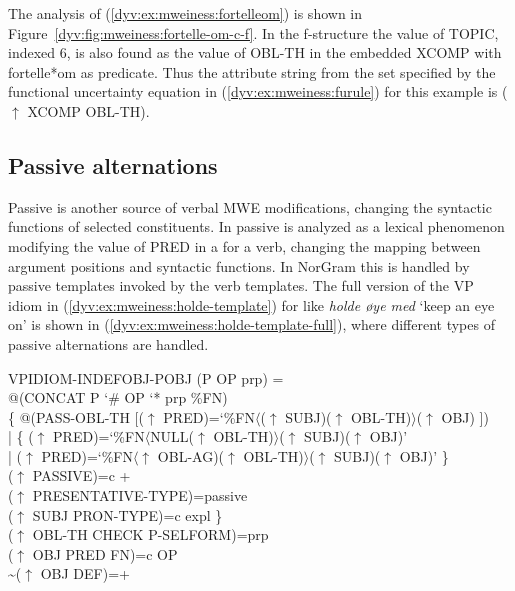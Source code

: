 \documentclass[output=paper]{langsci/langscibook}
\begin{document}
The analysis of  (\ref{dyv:ex:mweiness:fortelleom}) is shown in Figure~\ref{dyv:fig:mweiness:fortelle-om-c-f}.
In the f-structure the value of \textsf{TOPIC}, indexed \textsf{6}, is also found as the value of \textsf{OBL-TH} in the embedded \textsf{XCOMP} with \textsf{fortelle*om} as predicate.
Thus the attribute string from the set specified by the functional uncertainty equation in (\ref{dyv:ex:mweiness:furule}) for this example is \textsf{($\uparrow$ XCOMP OBL-TH)}.

\subsection{Passive alternations}\label{dyv:sec:mweiness:vpidiomsyntax}

Passive is another source of verbal MWE modifications, changing the syntactic functions of selected constituents.
In  passive is analyzed as a lexical phenomenon modifying the value of PRED in a  for a verb, changing the mapping between argument positions and syntactic functions.
In NorGram this is handled by passive templates invoked by the verb templates.
The full version of the VP idiom  in (\ref{dyv:ex:mweiness:holde-template}) for  like \textit{holde øye med} `keep an eye on' is shown in (\ref{dyv:ex:mweiness:holde-template-full}), where different types of passive alternations are handled.


\ea\label{dyv:ex:mweiness:holde-template-full}
{\sffamily 
 VPIDIOM-INDEFOBJ-POBJ (P OP prp) =\\%
\hspace{1.5em} @(CONCAT P `\# OP `* prp \%FN)\\%
\hspace{1.5em}  \{ \enspace @(PASS-OBL-TH [($\uparrow$  PRED)=`\%FN$\langle$($\uparrow$ SUBJ)($\uparrow$ OBL-TH)$\rangle$($\uparrow$ OBJ) ])\\%
\hspace{1.5em} | \enspace \{ \enspace ($\uparrow$  PRED)=`\%FN$\langle$NULL($\uparrow$ OBL-TH)$\rangle$($\uparrow$ SUBJ)($\uparrow$ OBJ)'\\%
\hspace{1.5em} \quad | \enspace ($\uparrow$  PRED)=`\%FN$\langle$$\uparrow$ OBL-AG)($\uparrow$  OBL-TH)$\rangle$($\uparrow$ SUBJ)($\uparrow$ OBJ)' \enspace \}\\%
\hspace{1.5em} \quad ($\uparrow$ PASSIVE)=c +\\%
\hspace{1.5em} \quad ($\uparrow$ PRESENTATIVE-TYPE)=passive\\%
\hspace{1.5em} \quad ($\uparrow$ SUBJ PRON-TYPE)=c expl \enspace \}\\%
\hspace{1.5em} ($\uparrow$ OBL-TH CHECK P-SELFORM)=prp\\%
\hspace{1.5em} ($\uparrow$ OBJ PRED FN)=c OP\\%
\hspace{1.5em} {\textasciitilde}($\uparrow$ OBJ DEF)=+
}
\z
\end{document}
